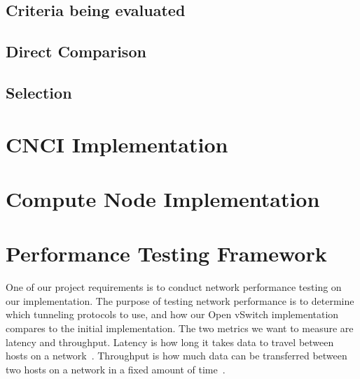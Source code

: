 \documentclass[10pt,letterpaper,onecolumn,draftclsnofoot]{IEEEtran}
\begin{document}
\subsection{Criteria being evaluated}

\subsubsection{}

\subsubsection{}

\subsubsection{}

\subsubsection{}

\subsection{Direct Comparison}

\subsection{Selection}


\section{CNCI Implementation}

\section{Compute Node Implementation}

\section{Performance Testing Framework}
One of our project requirements is to conduct network performance testing on our implementation.
The purpose of testing network performance is to determine which tunneling protocols to use, 
and how our Open vSwitch implementation compares to the initial implementation.
The two metrics we want to measure are latency and throughput.
Latency is how long it takes data to travel between hosts on a network~\cite{topdown-ssl}.
Throughput is how much data can be transferred between two hosts on a network in a fixed amount of time~\cite{topdown-ssl}.
\end{document}
